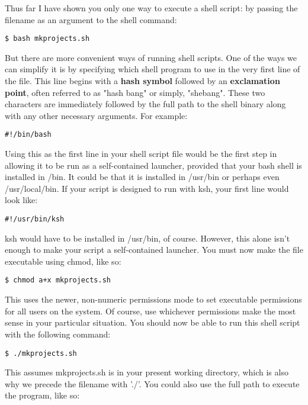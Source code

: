 Thus far I have shown you only one way to execute a shell script: by passing the filename as an argument to the shell command:

\begin{verbatim}
$ bash mkprojects.sh
\end{verbatim}

But there are more convenient ways of running shell scripts.  One of the ways we can simplify it is by specifying which shell program to use in the very first line of the file.  This line begins with a \textbf{hash symbol} followed by an \textbf{exclamation point}, often referred to as "hash bang" or simply, "shebang".  These two characters are immediately followed by the full path to the shell binary along with any other necessary arguments.  For example:

\begin{verbatim}
#!/bin/bash
\end{verbatim}

Using this as the first line in your shell script file would be the first step in allowing it to be run as a self-contained launcher, provided that your bash shell is installed in /bin.  It could be that it is installed in /usr/bin or perhaps even /usr/local/bin.  If your script is designed to run with ksh, your first line would look like:

\begin{verbatim}
#!/usr/bin/ksh
\end{verbatim}

ksh would have to be installed in /usr/bin, of course.  However, this alone isn't enough to make your script a self-contained launcher.  You must now make the file executable using chmod, like so:

\begin{verbatim}
$ chmod a+x mkprojects.sh
\end{verbatim}

This uses the newer, non-numeric permissions mode to set executable permissions for all users on the system.  Of course, use whichever permissions make the most sense in your particular situation.  You should now be able to run this shell script with the following command:

\begin{verbatim}
$ ./mkprojects.sh
\end{verbatim}

This assumes mkprojects.sh is in your present working directory, which is also why we precede the filename with './'.  You could also use the full path to execute the program, like so:

